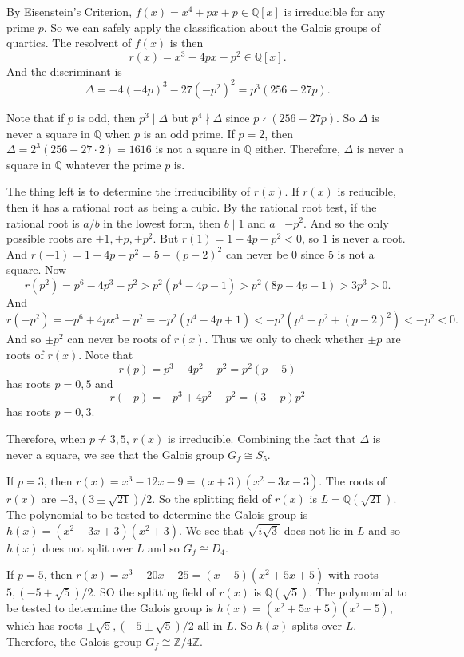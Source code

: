 \documentclass[12pt,reqno]{article}
\theoremstyle{definition}
\newcommand{\qq}{\mathbb{Q}}
\newcommand{\zz}{\mathbb{Z}}
\begin{document}
\begin{solution}{2}
	By Eisenstein's Criterion, $f(x)=x^4+px+p\in \qq[x]$ is irreducible for any prime $p$. So we can safely apply the classification about the Galois groups of quartics. The resolvent of $f(x)$ is then
	\[r(x)=x^3-4px-p^2\in \qq[x].\]
	And the discriminant is
	\[\Delta=-4(-4p)^3-27(-p^2)^2=p^3(256-27p).\]

	Note that if $p$ is odd, then $p^3\mid \Delta$ but $p^4\nmid \Delta$ since $p\nmid (256-27p)$. So $\Delta$ is never a square in $\qq$ when $p$ is an odd prime. If $p=2$, then $\Delta= 2^3(256-27\cdot 2)=1616$ is not a square in $\qq$ either. Therefore, $\Delta$ is never a square in $\qq$ whatever the prime $p$ is.

	The thing left is to determine the irreducibility of $r(x)$. If $r(x)$ is reducible, then it has a rational root as being a cubic. By the rational root test, if the rational root is $a/b$ in the lowest form, then $b\mid 1$ and $a\mid -p^2$. And so the only possible roots are $\pm1,\pm p,\pm p^2$. But $r(1)=1-4p-p^2 < 0$, so $1$ is never a root. And $r(-1)=1+4p-p^2=5-(p-2)^2$ can never be 0 since $5$ is not a square. Now $$r(p^2)=p^6-4p^3-p^2 > p^2(p^4-4p-1)> p^2(8p-4p-1)>3p^3>0.$$
	And $$r(-p^2)=-p^6+4px^3-p^2=-p^2(p^4-4p+1) < -p^2(p^4-p^2+(p-2)^2) <-p^2<0.$$ And so $\pm p^2$ can never be roots of $r(x)$. Thus we only to check whether $\pm p$ are roots of $r(x)$.
	Note that $$r(p)=p^3-4p^2-p^2=p^2(p-5)$$ has roots $p=0,5$ and $$r(-p)=-p^3+4p^2-p^2=(3-p)p^2$$ has roots $p=0,3$.

	Therefore, when $p\not= 3,5$, $r(x)$ is irreducible. Combining the fact that $\Delta$ is never a square, we see that the Galois group $G_f\cong S_5$.

	If $p=3$, then $r(x)=x^3-12x-9=(x+3)(x^2-3x-3)$. The roots of $r(x)$ are $-3,(3\pm \sqrt{21})/2$. So the splitting field of $r(x)$ is $L=\qq(\sqrt{21})$. The polynomial to be tested to determine the Galois group is $h(x)=(x^2+3x+3)(x^2+3)$. We see that $\sqrt{i\sqrt{3}}$ does not lie in $L$ and so $h(x)$ does not split over $L$ and so $G_f\cong D_4$.

	If $p=5$, then $r(x)=x^3-20x-25=(x-5)(x^2+5x+5)$ with roots $5,(-5+\sqrt{5})/2$. SO the splitting field of $r(x)$ is $\qq(\sqrt{5})$. The polynomial to be tested to determine the Galois group is $h(x)=(x^2+5x+5)(x^2-5)$, which has roots $\pm\sqrt{5}, (-5\pm\sqrt{5})/2$ all in $L$. So $h(x)$ splits over $L$. Therefore, the Galois group $G_f\cong \zz/4\zz$.
\end{solution}
\end{document}
